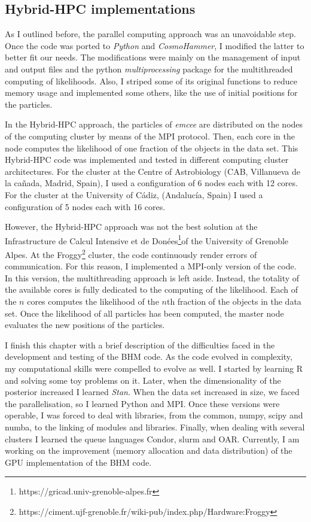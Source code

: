 \subsection{Hybrid-HPC implementations}
\label{sect:HHPC}
As I outlined before, the parallel computing approach was an unavoidable step. Once the code was ported to \emph{Python} and \emph{CosmoHammer}, I modified the latter to better fit our needs. The modifications were mainly on the management of input and output files and the python \emph{multiprocessing} package for the multithreaded computing of likelihoods. Also, I striped some of its original functions to reduce memory usage and implemented some others, like the use of initial positions for the particles.

In the Hybrid-HPC approach, the particles of \emph{emcee} are distributed on the nodes of the computing cluster by means of the MPI protocol. Then, each core in the node computes the likelihood of one fraction of the objects in the data set. This Hybrid-HPC code was implemented and tested in different computing cluster architectures. For the cluster at the Centre of Astrobiology (CAB, Villanueva de la ca\~nada, Madrid, Spain), I used a configuration of 6 nodes each with 12 cores. For the cluster at the University of C\'adiz, (Andalucía, Spain) I used a configuration of 5 nodes each with 16 cores.

However, the  Hybrid-HPC approach was not the best solution at the Infrastructure de Calcul Intensive et de Donées\footnote{https://gricad.univ-grenoble-alpes.fr}of the University of Grenoble Alpes. At the Froggy\footnote{https://ciment.ujf-grenoble.fr/wiki-pub/index.php/Hardware:Froggy} cluster, the code continuously render errors of communication. For this reason, I implemented a MPI-only version of the code. In this version, the multithreading approach is left aside. Instead, the totality of the available cores is fully dedicated to the computing of the likelihood. Each of the $n$ cores computes the likelihood of the $n$th fraction of the objects in the data set. Once the likelihood of all particles has been computed, the master node evaluates the new positions of the particles.

I finish this chapter with a brief description of the difficulties faced in the development and testing of the BHM code. As the code evolved in complexity, my computational skills were compelled to evolve as well. I started by learning R and solving some toy problems on it. Later, when the dimensionality of the posterior increased I learned \emph{Stan}. When the data set increased in size, we faced the parallelisation, so I learned Python and MPI. Once these versions were operable, I was forced to deal with libraries, from the common, numpy, scipy and numba, to the linking of modules and libraries. Finally, when dealing with several clusters I learned the queue languages Condor, slurm and OAR. Currently, I am working on the improvement (memory allocation and data distribution) of the GPU implementation of the BHM code.  



